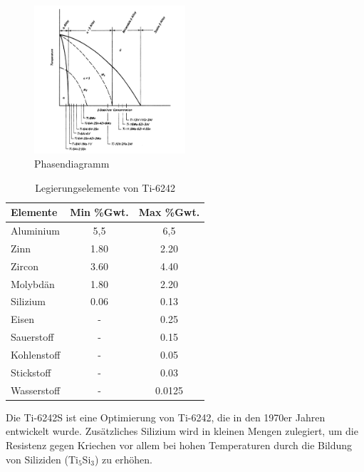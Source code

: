 \begin{figure}[H]
	\centering
	\includegraphics[width=0.5\textwidth]{Bilder/Phasendiagram}
    \caption{Phasendiagramm \cite{M.J.Donachie.2010}}
	\label{tab:PD-Ti6242}
\end{figure}





\begin{table}[H]
	
	\centering	
	\begin{tabular}{|l |c |c|}
		\hline
		\hspace{20ex}Elemente \hspace{20ex} & Min \%Gwt. & Max \%Gwt.\\
		\hline
		Aluminium&5,5&6,5\\
		Zinn&1.80&2.20\\
		Zircon&3.60&4.40\\
		Molybdän&1.80&2.20\\
		Silizium &0.06&0.13\\
		Eisen&-&0.25\\
		Sauerstoff&-&0.15\\
		Kohlenstoff&	-&	0.05\\
		Stickstoff&-&0.03\\
		Wasserstoff&-&0.0125\\
		
		
		\hline
	\end{tabular}
	\caption{Legierungselemente von Ti-6242 \cite{M.J.Donachie.2010}}
	\label{tab:Zusammensetzung}
\end{table}


Die Ti-6242S ist eine Optimierung von Ti-6242, die in den 1970er Jahren  entwickelt wurde. Zusätzliches Silizium wird in kleinen Mengen zulegiert, um die Resistenz gegen Kriechen vor allem bei hohen Temperaturen durch die Bildung von Siliziden (Ti$_5$Si$_3$) zu erhöhen.%

